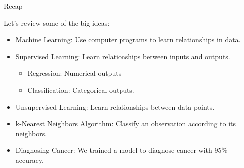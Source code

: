 \documentclass[8pt,aspectratio=169]{beamer}
\begin{document}
\begin{frame}{Recap}

Let's review some of the big ideas:

\begin{itemize}
\pause \item Machine Learning: Use computer programs to learn relationships in data.
\pause \item Supervised Learning: Learn relationships between inputs and outputs.
	\begin{itemize}
	\pause \item Regression: Numerical outputs.
	\pause \item Classification: Categorical outputs.
	\end{itemize}
\pause \item Unsupervised Learning: Learn relationships between data points.
\pause \item k-Nearest Neighbors Algorithm: Classify an observation according to its neighbors.
\pause \item Diagnosing Cancer: We trained a model to diagnose cancer with 95\% accuracy.
\end{itemize}

\end{frame}
\end{document}
